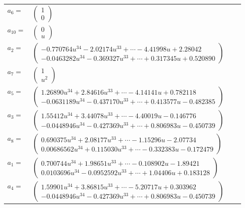 \documentclass[1p]{elsarticle_modified}
\theoremstyle{definition}
\begin{document}
\begin{tabular}{m{7pt} m{180pt} m{7pt} m{180pt} }
\flushright $a_{6}=$&$\begin{pmatrix}1\\0\end{pmatrix}$ \\
\flushright $a_{10}=$&$\begin{pmatrix}0\\u\end{pmatrix}$ \\
\flushright $a_{2}=$&$\begin{pmatrix}-0.770764 u^{34}-2.02174 u^{33}+\cdots-4.41998 u+2.28042\\-0.0463282 u^{34}-0.369327 u^{33}+\cdots+0.317345 u+0.520890\end{pmatrix}$ \\
\flushright $a_{7}=$&$\begin{pmatrix}1\\u^2\end{pmatrix}$ \\
\flushright $a_{5}=$&$\begin{pmatrix}1.26890 u^{34}+2.84616 u^{33}+\cdots-4.14141 u+0.782118\\-0.0631189 u^{34}-0.437170 u^{33}+\cdots+0.413577 u-0.482385\end{pmatrix}$ \\
\flushright $a_{3}=$&$\begin{pmatrix}1.55412 u^{34}+3.44078 u^{33}+\cdots-4.40019 u-0.146776\\-0.0448946 u^{34}-0.427369 u^{33}+\cdots+0.806983 u-0.450739\end{pmatrix}$ \\
\flushright $a_{8}=$&$\begin{pmatrix}0.690375 u^{34}+2.08177 u^{33}+\cdots-1.15296 u-2.07734\\0.00686562 u^{34}+0.115030 u^{33}+\cdots-0.332383 u-0.172479\end{pmatrix}$ \\
\flushright $a_{1}=$&$\begin{pmatrix}0.700744 u^{34}+1.98651 u^{33}+\cdots-0.108902 u-1.89421\\0.0103696 u^{34}-0.0952592 u^{33}+\cdots+1.04406 u+0.183128\end{pmatrix}$ \\
\flushright $a_{4}=$&$\begin{pmatrix}1.59901 u^{34}+3.86815 u^{33}+\cdots-5.20717 u+0.303962\\-0.0448946 u^{34}-0.427369 u^{33}+\cdots+0.806983 u-0.450739\end{pmatrix}$ \\

\end{tabular}
\end{document}
